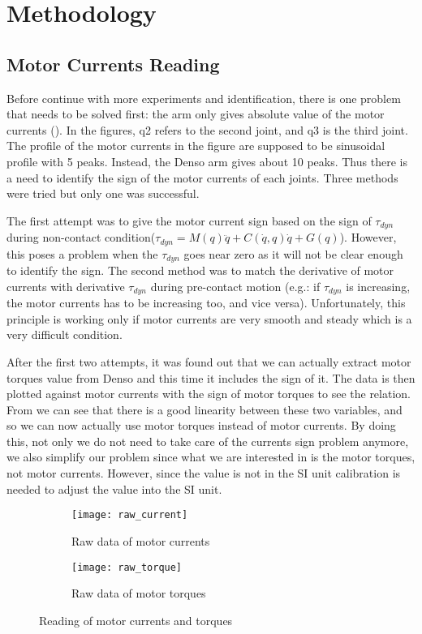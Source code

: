 \chapter{Methodology}
\section{Motor Currents Reading}
\label{motor currents}

Before continue with more experiments and identification, there is one problem that needs to be solved first: the arm only gives absolute value of the motor currents (). In the figures, q2 refers to the second joint, and q3 is the third joint. The profile of the motor currents in the figure are supposed to be sinusoidal profile with 5 peaks. Instead, the Denso arm gives about 10 peaks. Thus there is a need to identify the sign of the motor currents of each joints. Three methods were tried but only one was successful.

The first attempt was to give the motor current sign based on the sign of $\tau_{dyn}$ during non-contact condition($\tau_{dyn}= M\left(q\right)\ddot{q} + C\left(\dot{q} , q \right)\dot{q} + G\left(q \right) $). However, this poses a problem when the $\tau_{dyn}$ goes near zero as it will not be clear enough to identify the sign. The second method was to match the derivative of motor currents with derivative $\tau_{dyn}$ during pre-contact motion (e.g.: if $\tau_{dyn}$ is increasing, the motor currents has to be increasing too, and vice versa). Unfortunately, this principle is working only if motor currents are very smooth and steady which is a very difficult condition.

After the first two attempts, it was found out that we can actually extract motor torques value from Denso and this time it includes the sign of it. The data is then plotted against motor currents with the sign of motor torques to see the relation. From  we can see that there is a good linearity between these two variables, and so we can now actually use motor torques instead of motor currents. By doing this, not only we do not need to take care of the currents sign problem anymore, we also simplify our problem since what we are interested in is the motor torques, not motor currents. However, since the value is not in the SI unit calibration is needed to adjust the value into the SI unit. 

\begin{figure}[H]
  \begin{subfigure}[t]{0.5\textwidth}
    \centering
    \texttt{[image: raw\_current]} 
    \caption{Raw data of motor currents }
    \label{fig:raw current}
  \end{subfigure}
  \begin{subfigure}[t]{0.5\textwidth}
    \centering
    \texttt{[image: raw\_torque]}
    \caption{Raw data of motor torques }
    \label{fig:raw torque}
  \end{subfigure}
  \caption{Reading of motor currents and torques}
\end{figure}


